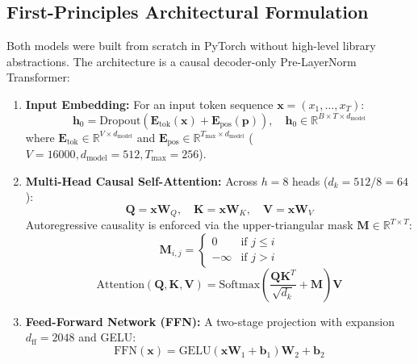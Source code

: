 \documentclass[11pt,a4paper]{article}
\begin{document}
\subsection{First-Principles Architectural Formulation}
Both models were built from scratch in PyTorch without high-level library abstractions. The architecture is a causal decoder-only Pre-LayerNorm Transformer:
\begin{enumerate}[noitemsep]
    \item \textbf{Input Embedding:} For an input token sequence $\mathbf{x} = (x_1, \dots, x_T)$:
    \begin{equation}
        \mathbf{h}_0 = \text{Dropout}\left(\mathbf{E}_{\text{tok}}(\mathbf{x}) + \mathbf{E}_{\text{pos}}(\mathbf{p})\right), \quad \mathbf{h}_0 \in \mathbb{R}^{B \times T \times d_{\text{model}}}
    \end{equation}
    where $\mathbf{E}_{\text{tok}} \in \mathbb{R}^{V \times d_{\text{model}}}$ and $\mathbf{E}_{\text{pos}} \in \mathbb{R}^{T_{\text{max}} \times d_{\text{model}}}$ ($V = 16000, d_{\text{model}} = 512, T_{\text{max}} = 256$).
    \item \textbf{Multi-Head Causal Self-Attention:} Across $h=8$ heads ($d_k = 512/8 = 64$):
    \begin{equation}
        \mathbf{Q} = \mathbf{x}\mathbf{W}_Q, \quad \mathbf{K} = \mathbf{x}\mathbf{W}_K, \quad \mathbf{V} = \mathbf{x}\mathbf{W}_V
    \end{equation}
    Autoregressive causality is enforced via the upper-triangular mask $\mathbf{M} \in \mathbb{R}^{T \times T}$:
    \begin{equation}
        \mathbf{M}_{i, j} = \begin{cases} 0 & \text{if } j \le i \\ -\infty & \text{if } j > i \end{cases}
    \end{equation}
    \begin{equation}
        \text{Attention}(\mathbf{Q}, \mathbf{K}, \mathbf{V}) = \text{Softmax}\left(\frac{\mathbf{Q}\mathbf{K}^T}{\sqrt{d_k}} + \mathbf{M}\right)\mathbf{V}
    \end{equation}
    \item \textbf{Feed-Forward Network (FFN):} A two-stage projection with expansion $d_{\text{ff}} = 2048$ and GELU:
    \begin{equation}
        \text{FFN}(\mathbf{x}) = \text{GELU}(\mathbf{x}\mathbf{W}_1 + \mathbf{b}_1)\mathbf{W}_2 + \mathbf{b}_2
    \end{equation}

\end{enumerate}
\end{document}
